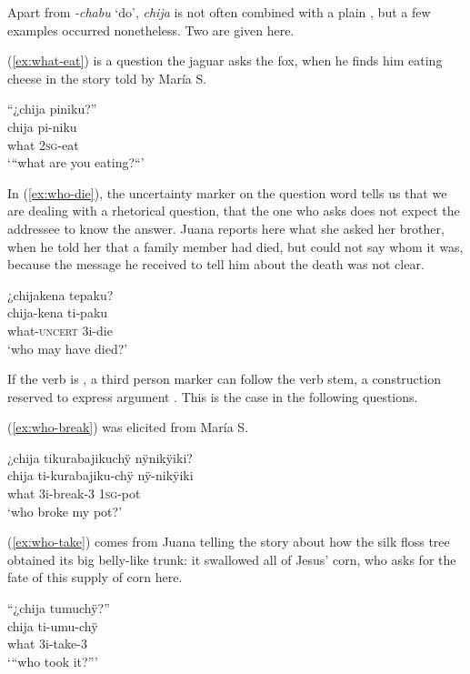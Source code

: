Apart from \textit{-chabu} ‘do’, \textit{chija} is not often combined with a plain , but a few examples occurred nonetheless. Two are given here. 

(\ref{ex:what-eat}) is a question the jaguar asks the fox, when he finds him eating cheese in the story told by María S.

\ea\label{ex:what-eat}
\begingl
\glpreamble “¿chija piniku?”\\
\gla chija pi-niku\\
\glb what 2\textsc{sg}-eat\\
\glft ‘“what are you eating?“’
\endgl
\trailingcitation{[rxx-n120511l-1.031]}
\xe

In (\ref{ex:who-die}), the uncertainty marker on the question word tells us that we are dealing with a rhetorical question, that the one who asks does not expect the addressee to know the answer. Juana reports here what she asked her brother, when he told her that a family member had died, but could not say whom it was, because the message he received to tell him about the death was not clear.

\ea\label{ex:who-die}
\begingl
\glpreamble ¿chijakena tepaku?\\
\gla chija-kena ti-paku\\
\glb what-\textsc{uncert} 3i-die\\
\glft ‘who may have died?’
\endgl
\trailingcitation{[jxx-p120430l-2.285]}
\xe


If the verb is , a third person marker can follow the verb stem, a construction reserved to express argument . This is the case in the following questions.

(\ref{ex:who-break}) was elicited from María S.

\ea\label{ex:who-break}
\begingl
\glpreamble ¿chija tikurabajikuchÿ nÿnikÿiki?\\
\gla chija ti-kurabajiku-chÿ nÿ-nikÿiki\\
\glb what 3i-break-3 1\textsc{sg}-pot\\
\glft ‘who broke my pot?’
\endgl
\trailingcitation{[rxx-e181024l]}
\xe

(\ref{ex:who-take}) comes from Juana telling the story about how the silk floss tree obtained its big belly-like trunk: it swallowed all of Jesus’ corn, who asks for the fate of this supply of corn here.

\ea\label{ex:who-take}
\begingl
\glpreamble “¿chija tumuchÿ?”\\
\gla chija ti-umu-chÿ\\
\glb what 3i-take-3\\
\glft ‘“who took it?”’
\endgl
\trailingcitation{[jxx-n101013s-1.663]}
\xe


